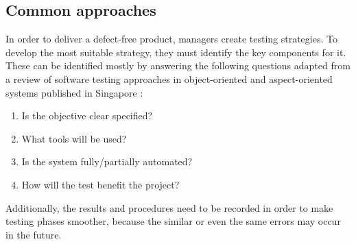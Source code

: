\subsection{Common approaches}
In order to deliver a defect-free product, managers create testing strategies.
To develop the most suitable strategy, they must identify the key components for it. These can be identified mostly by answering the following questions adapted from a review
of software testing approaches in object-oriented and aspect-oriented systems published in Singapore \cite{10.1007/978-981-10-8848-3_46}:
\begin{enumerate}
	\item Is the objective clear specified?
	\item What tools will be used?
	\item Is the system fully/partially automated?
	\item How will the test benefit the project?
\end{enumerate}
Additionally, the results and procedures need to be recorded in order to make testing phases smoother, because the similar or even the same errors may occur in the future.
% 
